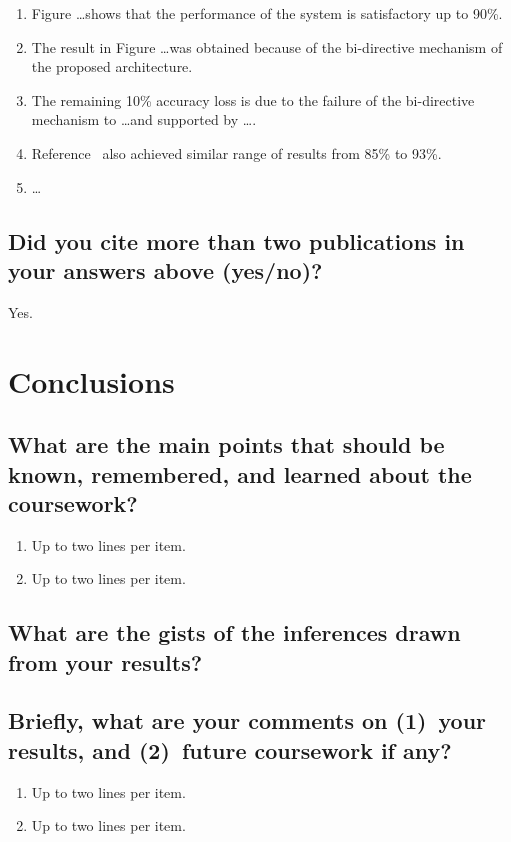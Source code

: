 \begin{enumerate}
\item Figure \ldots shows that the performance of the system is satisfactory up to 90\%.
\item The result in Figure \ldots was obtained because of the bi-directive mechanism of the proposed architecture.
\item The remaining 10\% accuracy loss is due to the failure of the bi-directive mechanism to \ldots and supported by \ldots.
\item Reference~\cite{Einstein1905} also achieved similar range of results from 85\% to 93\%.
\item \ldots
\end{enumerate}
	
\subsection{Did you cite more than two publications in your answers above (yes/no)?}
Yes.	



















\section{Conclusions}
\label{sec:conc}

\subsection{What are the main points that should be known, remembered, and learned about the coursework?}
\begin{enumerate}
\item Up to two lines per item.
\item Up to two lines per item.
\end{enumerate}

\subsection{What are the gists of the inferences drawn from your results?}

\subsection{Briefly, what are your comments on (1)~your results, and  (2)~future coursework if any?}
\begin{enumerate}
\item Up to two lines per item.
\item Up to two lines per item.
\end{enumerate}	



